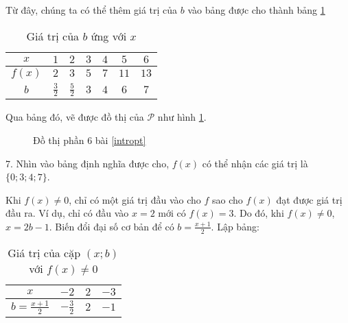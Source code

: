 Từ đây, chúng ta có thể thêm giá trị của $b$ vào bảng được cho thành bảng \ref{tab:ham_so_mot_bien:dinh_nghia:b_values6}

\begin{table}[h]
   \centering
   \begin{tabular}{|c|c|c|c|c|c|c|}
      \hline
      $x$ & $1$ & $2$ & $3$ & $4$ & $5$ & $6$\\
      \hline
      $f(x)$ & $2$ & $3$ & $5$ & $7$ & $11$ & $13$\\
      \hline
      $b$ & $\frac{3}{2}$ & $\frac{5}{2}$ & $3$ & $4$ & $6$ & $7$\\
      \hline
   \end{tabular}
   \caption{Giá trị của $b$ ứng với $x$}
   \label{tab:ham_so_mot_bien:dinh_nghia:b_values6}
\end{table}

Qua bảng đó, vẽ được đồ thị của $\mathcal{P}$ như hình \ref{fig:ham_so_mot_bien:dinh_nghia:dtp6}.

\begin{figure}[h]
   \centering
   \caption{Đồ thị phần 6 bài \ref{intropt}}
   \label{fig:ham_so_mot_bien:dinh_nghia:dtp6}
\end{figure}

7. Nhìn vào bảng định nghĩa được cho, $f(x)$ có thể nhận các giá trị là $\{0; 3; 4; 7\}$.

Khi $f(x) \neq 0$, chỉ có một giá trị đầu vào cho $f$ sao cho $f(x)$ đạt được giá trị đầu ra. Ví dụ, chỉ có đầu vào $x = 2$ mới có $f(x) = 3$. Do đó, khi $f(x) \neq 0$, $x = 2b-1$. Biến đổi đại số cơ bản để có $b = \frac{x + 1}{2}$. Lập bảng:

\begin{table}[h]
   \centering
   \begin{tabular}{|c|c|c|c|}
      \hline
      $x$ & $-2$ & $2$ & $-3$\\
      \hline
      $b = \frac{x+1}{2}$ & $-\frac{3}{2}$ & $2$ & $-1$\\
      \hline
   \end{tabular}
   \caption{Giá trị của cặp $(x; b)$ với $f(x) \neq 0$}
   \label{tab:ham_so_mot_bien:dinh_nghia:b_values7}
\end{table}

